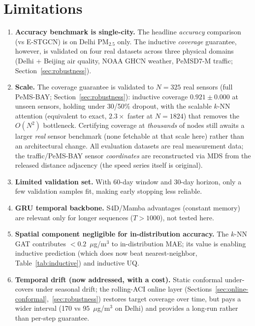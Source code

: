 \documentclass[journal]{IEEEtran}
\begin{document}
\section{Limitations}
\label{sec:limitations}

\begin{enumerate}
\item \textbf{Accuracy benchmark is single-city.} The headline \emph{accuracy} comparison (vs E-STGCN) is on Delhi PM$_{2.5}$ only. The inductive \emph{coverage} guarantee, however, is validated on four real datasets across three physical domains (Delhi + Beijing air quality, NOAA GHCN weather, PeMSD7-M traffic; Section~\ref{sec:robustness}).
\item \textbf{Scale.} The coverage guarantee is validated to $N{=}325$ real sensors (full PeMS-BAY; Section~\ref{sec:robustness}): inductive coverage $0.921\pm0.000$ at unseen sensors, holding under 30/50\% dropout, with the scalable $k$-NN attention (equivalent to exact, $2.3\times$ faster at $N{=}1824$) that removes the $O(N^2)$ bottleneck. Certifying coverage at \emph{thousands} of nodes still awaits a larger \emph{real} sensor benchmark (none fetchable at that scale here) rather than an architectural change. All evaluation datasets are real measurement data; the traffic/PeMS-BAY sensor \emph{coordinates} are reconstructed via MDS from the released distance adjacency (the speed series itself is original).
\item \textbf{Limited validation set.} With 60-day window and 30-day horizon, only a few validation samples fit, making early stopping less reliable.
\item \textbf{GRU temporal backbone.} S4D/Mamba advantages (constant memory) are relevant only for longer sequences ($T > 1000$), not tested here.
\item \textbf{Spatial component negligible for in-distribution accuracy.} The $k$-NN GAT contributes $<0.2$~$\mu$g/m$^3$ to in-distribution MAE; its value is enabling inductive prediction (which does now beat nearest-neighbor, Table~\ref{tab:inductive}) and inductive UQ.
\item \textbf{Temporal drift (now addressed, with a cost).} Static conformal under-covers under seasonal drift; the rolling-ACI online layer (Sections~\ref{sec:online-conformal},~\ref{sec:robustness}) restores target coverage over time, but pays a wider interval (170 vs 95~$\mu$g/m$^3$ on Delhi) and provides a long-run rather than per-step guarantee.

\end{enumerate}
\end{document}
